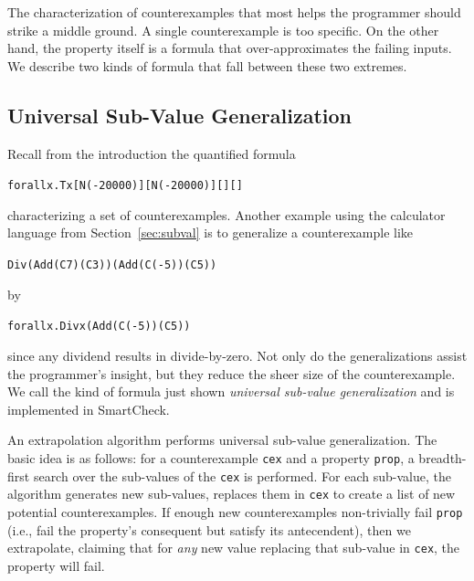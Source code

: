 \documentclass{sigplanconf}
\newenvironment{code}{\begin{alltt}}{\end{alltt}}
\newcommand{\ttp}[1]{\texttt{#1}}
\begin{document}
The characterization of counterexamples that most helps the programmer should
strike a middle ground.  A single counterexample is too specific.  On the other
hand, the property itself is a formula that over-approximates the failing
inputs.  We describe two kinds of formula that fall between these two extremes.

\subsection{Universal Sub-Value Generalization}\label{sec:universal}
Recall from the introduction the quantified formula
%
\begin{code}
forall x . T x [N (-20000)] [N (-20000)] [] []
\end{code}
%
\noindent
characterizing a set of counterexamples.  Another example using the calculator
language from Section~\ref{sec:subval} is to generalize a counterexample like
%
\begin{code}
Div (Add (C 7) (C 3)) (Add (C (-5)) (C 5))
\end{code}
%
\noindent
by
%
\begin{code}
forall x . Div x (Add (C (-5)) (C 5))
\end{code}
%
\noindent
since any dividend results in divide-by-zero.  Not only do the generalizations
assist the programmer's insight, but they reduce the sheer size of the
counterexample.  We call the kind of formula just shown \emph{universal
  sub-value generalization} and is implemented in SmartCheck.

An extrapolation algorithm performs universal sub-value generalization.  The
basic idea is as follows: for a counterexample \ttp{cex} and a property
\ttp{prop}, a breadth-first search over the sub-values of the \ttp{cex} is
performed.  For each sub-value, the algorithm generates new sub-values, replaces
them in \ttp{cex} to create a list of new potential counterexamples.  If enough
new counterexamples non-trivially fail \ttp{prop} (i.e., fail the property's
consequent but satisfy its antecendent), then we extrapolate, claiming that for
\emph{any} new value replacing that sub-value in \ttp{cex}, the property will
fail.
\end{document}
